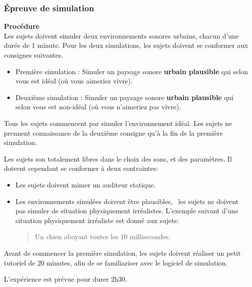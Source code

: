 \subsubsection{Épreuve de simulation}

\textbf{Procédure} \\

Les sujets doivent simuler deux environnements sonores urbains, chacun d'une durée de 1 minute.  Pour les deux simulations, les sujets doivent se conformer aux consignes suivantes.

\begin{itemize}
\item Première simulation : Simuler un paysage sonore \textbf{urbain plausible} qui selon vous est idéal (où vous aimeriez vivre).
\item Deuxième simulation : Simuler un paysage sonore \textbf{urbain plausible} qui selon vous est non-idéal (où vous n'aimeriez pas vivre).
\end{itemize}

Tous les sujets commencent par simuler l'environnement idéal. Les sujets ne prennent connaissance de la deuxième consigne qu'à la fin de la première simulation.

Les sujets son totalement libres dans le choix des sons, et des paramètres. Il doivent cependant se conformer à deux contraintes:

\begin{itemize}

\item Les sujets doivent mimer un auditeur statique.
 
\item Les environnements simulées doivent être plausibles, \ie~les sujets ne doivent pas simuler de situation physiquement irréalistes. L'exemple suivant d'une situation physiquement irréaliste est donné aux sujets: 

\begin{quote}
Un chien aboyant toutes les 10 millisecondes.
\end{quote}

\end{itemize}

Avant de commencer la première simulation, les sujets doivent réaliser un petit tutoriel de 20 minutes, afin de se familiariser avec le logiciel de simulation.

L'expérience est prévue pour durer 2h30. \\


 \\


